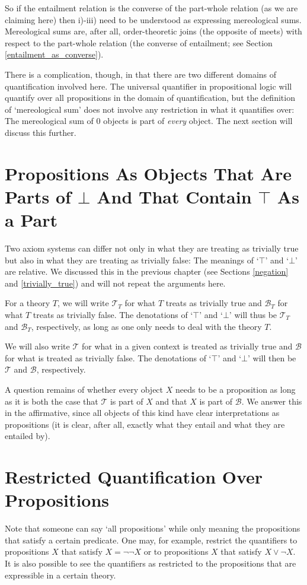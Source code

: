 \documentclass[12pt]{book}
\begin{document}
So if the entailment relation is the converse of the part-whole relation (as we are claiming here) then i)-iii) need to be understood as expressing mereological sums. Mereological sums are, after all, order-theoretic joins (the opposite of meets) with respect to the part-whole relation (the converse of entailment; see Section \ref{entailment_as_converse}).

There is a complication, though, in that there are two different domains of quantification involved here. The universal quantifier in propositional logic will quantify over all propositions in the domain of quantification, but the definition of `mereological sum' does not involve any restriction in what it quantifies over: The mereological sum of 0 objects is part of \textit{every} object. The next section will discuss this further.

\section{Propositions As Objects That Are Parts of $\bot$ And That Contain $\top$ As a Part}
Two axiom systems can differ not only in what they are treating as trivially true but also in what they are treating as trivially false: The meanings of `$\top$' and `$\bot$' are relative. We discussed this in the previous chapter (see Sections \ref{negation} and \ref{trivially_true}) and will not repeat the arguments here.

For a theory $T$, we will write $\mathcal{T}_T$ for what $T$ treats as trivially true and $\mathcal{B}_T$ for what $T$ treats as trivially false. The denotations of `$\top$' and `$\bot$' will thus be $\mathcal{T}_T$ and $\mathcal{B}_T$, respectively, as long as one only needs to deal with the theory $T$. 

We will also write $\mathcal{T}$ for what in a given context is treated as trivially true and $\mathcal{B}$ for what is treated as trivially false. The denotations of `$\top$' and `$\bot$' will then be $\mathcal{T}$ and $\mathcal{B}$, respectively.

A question remains of whether every object $X$ needs to be a proposition as long as it is both the case that $\mathcal{T}$ is part of $X$ and that $X$ is part of $\mathcal{B}$. We answer this in the affirmative, since all objects of this kind have clear interpretations as propositions (it is clear, after all, exactly what they entail and what they are entailed by).
\section{Restricted Quantification Over Propositions}
Note that someone can say `all propositions' while only meaning the propositions that satisfy a certain predicate. One may, for example, restrict the quantifiers to propositions $X$ that satisfy $X = \neg \neg X$ or to propositions $X$ that satisfy $X \vee \neg X$. It is also possible to see the quantifiers as restricted to the propositions that are expressible in a certain theory.
\end{document}
